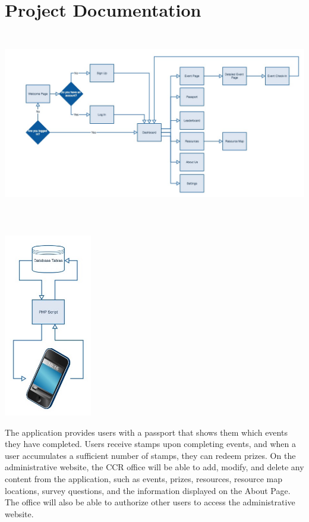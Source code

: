 \documentclass[onecolumn, draftclsnofoot,10pt, compsoc]{IEEEtran}
\begin{document}
\section{Project Documentation}
  \includegraphics[height=8cm]{appflow} \\ \\
  \begin{center}
    \includegraphics[height=8cm]{scriptflow}
  \end{center}
  The application provides users with a passport that shows them which events they have completed. Users receive stamps upon completing events, and when a user accumulates a sufficient number of stamps, they can redeem prizes. On the administrative website, the CCR office will be able to add, modify, and delete any content from the application, such as events, prizes, resources, resource map locations, survey questions, and the information displayed on the About Page. The office will also be able to authorize other users to access the administrative website. \\ \\
\end{document}
